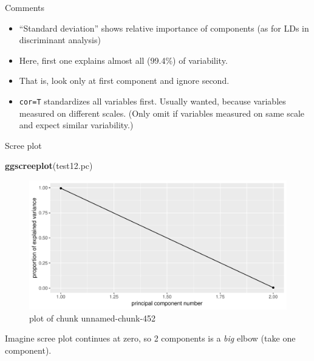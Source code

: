 \documentclass[ignorenonframetext,]{beamer}
\newenvironment{Shaded}{\begin{snugshade}}{\end{snugshade}}
\newcommand{\KeywordTok}[1]{\textcolor[rgb]{0.13,0.29,0.53}{\textbf{#1}}}
\newcommand{\NormalTok}[1]{#1}
\begin{document}
\begin{frame}[fragile]{Comments}
\protect\hypertarget{comments-23}{}

\begin{itemize}
\item
  ``Standard deviation'' shows relative importance of components (as for
  LDs in discriminant analysis)
\item
  Here, first one explains almost all (99.4\%) of variability.
\item
  That is, look only at first component and ignore second.
\item
  \texttt{cor=T} standardizes all variables first. Usually wanted,
  because variables measured on different scales. (Only omit if
  variables measured on same scale and expect similar variability.)
\end{itemize}

\end{frame}

\begin{frame}[fragile]{Scree plot}
\protect\hypertarget{scree-plot-1}{}

\begin{Shaded}
\begin{Highlighting}[]
\KeywordTok{ggscreeplot}\NormalTok{(test12.pc)}
\end{Highlighting}
\end{Shaded}

\begin{figure}
\centering
\includegraphics{figure/unnamed-chunk-452-1.pdf}
\caption{plot of chunk unnamed-chunk-452}
\end{figure}

Imagine scree plot continues at zero, so 2 components is a \emph{big}
elbow (take one component).

\end{frame}
\end{document}
